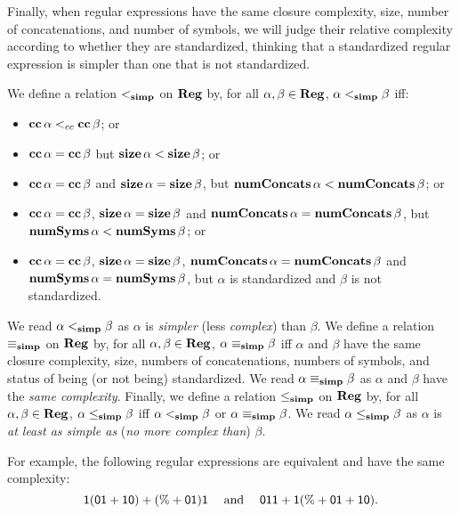 Finally, when regular expressions have the same closure complexity,
size, number of concatenations, and number of symbols, we will judge
their relative complexity according to whether they are standardized,
thinking that a standardized regular expression is simpler than one
that is not standardized.

We define a relation $\mathrel{<_{\mathbf{simp}}}$ on $\mathbf{Reg}$ by, for all $\alpha,\beta\in\mathbf{Reg}$,
$\alpha\mathrel{<_{\mathbf{simp}}}\beta$ iff:
\begin{itemize}
\item $\mathbf{cc}\,\alpha \mathrel{<_{cc}} \mathbf{cc}\,\beta$; or

\item $\mathbf{cc}\,\alpha = \mathbf{cc}\,\beta$ but $\mathbf{size}\,\alpha < \mathbf{size}\,\beta$; or

\item $\mathbf{cc}\,\alpha = \mathbf{cc}\,\beta$ and $\mathbf{size}\,\alpha = \mathbf{size}\,\beta$,
  but $\mathbf{numConcats}\,\alpha < \mathbf{numConcats}\,\beta$; or

\item $\mathbf{cc}\,\alpha = \mathbf{cc}\,\beta$, $\mathbf{size}\,\alpha = \mathbf{size}\,\beta$
  and $\mathbf{numConcats}\,\alpha = \mathbf{numConcats}\,\beta$, but
  $\mathbf{numSyms}\,\alpha < \mathbf{numSyms}\,\beta$; or

\item $\mathbf{cc}\,\alpha = \mathbf{cc}\,\beta$, $\mathbf{size}\,\alpha = \mathbf{size}\,\beta$,
  $\mathbf{numConcats}\,\alpha = \mathbf{numConcats}\,\beta$ and $\mathbf{numSyms}\,\alpha =
  \mathbf{numSyms}\,\beta$, but $\alpha$ is standardized and $\beta$ is
  not standardized.
\end{itemize}

We read $\alpha\mathrel{<_{\mathbf{simp}}}\beta$ as $\alpha$ is \emph{simpler} (less
\emph{complex}) than $\beta$.  We define a relation $\mathrel{\equiv_{\mathbf{simp}}}$ on
$\mathbf{Reg}$ by, for all $\alpha,\beta\in\mathbf{Reg}$, $\alpha\mathrel{\equiv_{\mathbf{simp}}}\beta$ iff
$\alpha$ and $\beta$ have the same closure complexity, size, numbers
of concatenations, numbers of symbols, and status of being (or not
being) standardized.  We read $\alpha\mathrel{\equiv_{\mathbf{simp}}}\beta$ as $\alpha$ and
$\beta$ have the \emph{same complexity}.  Finally, we define a
relation $\mathrel{\leq_{\mathbf{simp}}}$ on $\mathbf{Reg}$ by, for all $\alpha,\beta\in\mathbf{Reg}$,
$\alpha\mathrel{\leq_{\mathbf{simp}}}\beta$ iff $\alpha\mathrel{<_{\mathbf{simp}}}\beta$ or
$\alpha\mathrel{\equiv_{\mathbf{simp}}}\beta$.  We read $\alpha\mathrel{\leq_{\mathbf{simp}}}\beta$ as $\alpha$ is
\emph{at least as simple as} (\emph{no more complex than}) $\beta$.

For example, the following regular expressions are equivalent and have
the same complexity:
\begin{displaymath}
\mathsf{1(01 + 10) + (\% + 01)1} \quad\;\allowbreak\mbox{and}\allowbreak\;\quad
\mathsf{011 + 1(\% + 01 + 10)} .  
\end{displaymath}

